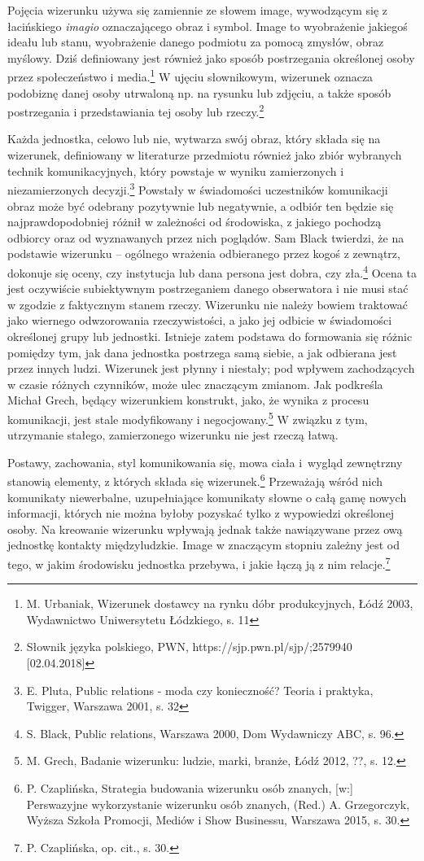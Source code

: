 \documentclass[12pt, a4paper, titlepage]{report}
\begin{document}
Pojęcia wizerunku używa się zamiennie ze słowem image, wywodzącym się z łacińskiego \textit{imagio} oznaczającego obraz i symbol. Image to wyobrażenie jakiegoś ideału lub stanu, wyobrażenie danego podmiotu za pomocą zmysłów, obraz myślowy. Dziś definiowany jest również jako sposób postrzegania określonej osoby przez społeczeństwo i media.\footnote{M. Urbaniak, Wizerunek dostawcy na rynku dóbr produkcyjnych, Łódź 2003, Wydawnictwo Uniwersytetu Łódzkiego, s. 11} W ujęciu słownikowym, wizerunek oznacza podobiznę danej osoby utrwaloną np. na rysunku lub zdjęciu, a także sposób postrzegania i przedstawiania tej osoby lub rzeczy.\footnote{Słownik języka polskiego, PWN, https://sjp.pwn.pl/sjp/;2579940 [02.04.2018]}

Każda jednostka, celowo lub nie, wytwarza swój obraz, który składa się na wizerunek, definiowany w literaturze przedmiotu również jako zbiór wybranych technik komunikacyjnych, który powstaje w wyniku zamierzonych i niezamierzonych decyzji.\footnote{E. Pluta, Public relations - moda czy konieczność? Teoria i praktyka, Twigger, Warszawa 2001, s. 32} Powstały w świadomości uczestników komunikacji obraz może być odebrany pozytywnie lub negatywnie, a odbiór ten będzie się najprawdopodobniej różnił w zależności od środowiska, z jakiego pochodzą odbiorcy oraz od wyznawanych przez nich poglądów. Sam Black twierdzi, że na podstawie wizerunku -- ogólnego wrażenia odbieranego przez kogoś z zewnątrz, dokonuje się oceny, czy instytucja lub dana persona jest dobra, czy zła.\footnote{S. Black, Public relations, Warszawa 2000, Dom Wydawniczy ABC, s. 96.} Ocena ta jest oczywiście subiektywnym postrzeganiem danego obserwatora i nie musi stać w zgodzie z faktycznym stanem rzeczy. Wizerunku nie należy bowiem traktować jako wiernego odwzorowania rzeczywistości, a jako jej odbicie w świadomości określonej grupy lub jednostki. Istnieje zatem podstawa do formowania się różnic pomiędzy tym, jak dana jednostka postrzega samą siebie, a jak odbierana jest przez innych ludzi. Wizerunek jest płynny i niestały; pod wpływem zachodzących w czasie różnych czynników, może ulec znaczącym zmianom. Jak podkreśla Michał Grech, będący wizerunkiem konstrukt, jako, że wynika z procesu komunikacji, jest stale modyfikowany i negocjowany.\footnote{M. Grech, Badanie wizerunku: ludzie, marki, branże, Łódź 2012, ??, s. 12.} W związku z tym, utrzymanie stałego, zamierzonego wizerunku nie jest rzeczą łatwą. 

Postawy, zachowania, styl komunikowania się, mowa ciała i~wygląd zewnętrzny stanowią elementy, z których składa się wizerunek.\footnote{P. Czaplińska, Strategia budowania wizerunku osób znanych, [w:] Perswazyjne wykorzystanie wizerunku osób znanych, (Red.) A. Grzegorczyk, Wyższa Szkoła Promocji, Mediów i Show Businessu, Warszawa 2015, s. 30.} Przeważają wśród nich komunikaty niewerbalne, uzupełniające komunikaty słowne o całą gamę nowych informacji, których nie można byłoby pozyskać tylko z wypowiedzi określonej osoby. Na kreowanie wizerunku wpływają jednak także nawiązywane przez ową jednostkę kontakty międzyludzkie. Image w znaczącym stopniu zależny jest od tego, w jakim środowisku jednostka przebywa, i jakie łączą ją z nim relacje.\footnote{P. Czaplińska, op. cit., s. 30.}
\end{document}
